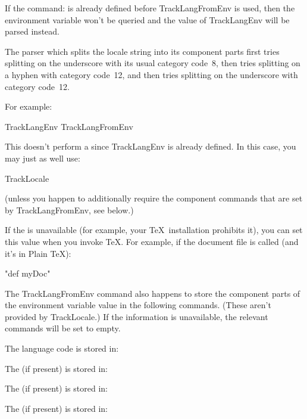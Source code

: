 \documentclass[titlepage=false,oneside,
 fontsize=12pt,captions=tableheading]{scrbook}
\begin{document}
If the command:
is already defined before \gls{TrackLangFromEnv} is used, then the
environment variable won't be queried and the value of
\gls{TrackLangEnv} will be parsed instead.

\begin{important}
The parser which splits the locale string into 
its component parts first tries splitting on the underscore
 with its usual category code~8, then tries splitting 
on a hyphen  with category code~12, and then tries 
splitting on the underscore  with category code~12.
\end{important}

For example:
\begin{codebox}
\gls{TrackLangEnv}
\gls{TrackLangFromEnv}
\end{codebox}
This doesn't perform a  since \gls{TrackLangEnv}
is already defined. In this case, you may just as well use:
\begin{codebox}
\gls{TrackLocale}
\end{codebox}
(unless you happen to additionally require the component
commands that are set by \gls{TrackLangFromEnv}, see below.)

If the  is unavailable 
(for example, your \TeX\ installation prohibits it), you
can set this value when you invoke \TeX. For example,
if the document file is called  (and it's
in Plain \TeX):
\begin{terminal}
 "def myDoc"
\end{terminal}

The \gls{TrackLangFromEnv} command also happens to store the
component parts of the environment variable value in the
following commands. (These aren't provided by \gls{TrackLocale}.)
If the information is unavailable, the relevant commands will be set
to empty.

The language code is stored in:

The  (if present) is stored in:

The  (if present) is stored in:

The  (if present) is stored in:
\end{document}
